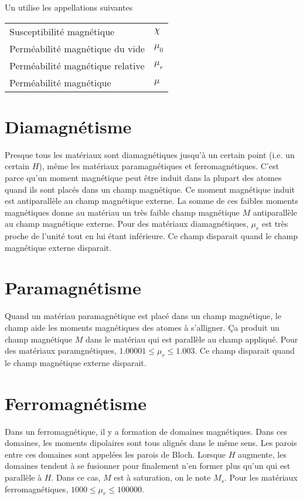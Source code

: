 Un utilise les appellations suivantes
\begin{center}
  \begin{tabular}{ll}
    Susceptibilité magnétique & $\chi$\\
    Perméabilité magnétique du vide & $\mu_0$\\
    Perméabilité magnétique relative & $\mu_r$\\
    Perméabilité magnétique & $\mu$
  \end{tabular}
\end{center}

\section{Diamagnétisme}
Presque tous les matériaux sont diamagnétiques jusqu'à un certain point
(i.e. un certain $H$), même les matériaux paramagnétiques et ferromagnétiques.
C'est parce qu'un moment magnétique peut être induit dans la plupart
des atomes quand ils sont placés dans un champ magnétique.
Ce moment magnétique induit est antiparallèle au champ magnétique externe.
La somme de ces faibles moments magnétiques donne au matériau
un très faible champ magnétique $M$ antiparallèle au champ magnétique externe.
Pour des matériaux diamagnétiques, $\mu_r$ est très proche de l'unité tout en
lui étant inférieure.
Ce champ disparait quand le champ magnétique externe disparait.


\section{Paramagnétisme}
Quand un matériau paramagnétique est placé dans un champ magnétique,
le champ aide les moments magnétiques des atomes à s'alligner.
Ça produit un champ magnétique $M$ dans le matériau
qui est parallèle au champ appliqué. Pour des matériaux paramgnétiques,
$1.00001 \leq \mu_r \leq 1.003$.
Ce champ disparait quand le champ magnétique externe disparait.

\section{Ferromagnétisme}
\label{sec:ferro}
Dans un ferromagnétique, il y a formation de domaines magnétiques.
Dans ces domaines, les moments dipolaires sont tous alignés dans le même sens.
Les parois entre ces domaines sont appelées les parois de Bloch.
Lorsque $H$ augmente,
les domaines tendent à se fusionner pour finalement
n'en former plus qu'un qui est parallèle à $H$.
Dans ce cas, $M$ est à saturation, on le note $M_s$.
Pour les matériaux ferromagnétiques, $1000 \leq \mu_r \leq 100000$.


